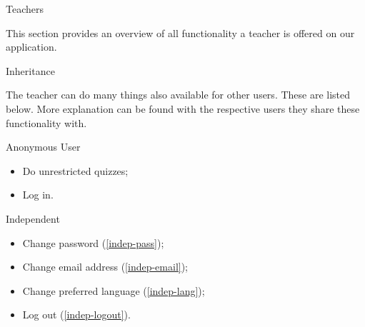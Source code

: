 
\begin{section}{Teachers}

    This section provides an overview of all functionality a teacher is offered
    on our application.

    \begin{subsection}{Inheritance}

        The teacher can do many things also available for other users. These are
        listed below. More explanation can be found with the respective users
        they share these functionality with.

        \begin{subsubsection}{Anonymous User}

            \begin{itemize}
                \item Do unrestricted quizzes;
                \item Log in.
            \end{itemize}

        \end{subsubsection}

        \begin{subsubsection}{Independent}

            \begin{itemize}
                \item Change password           (\ref{indep-pass});
                \item Change email address     (\ref{indep-email});
                \item Change preferred language (\ref{indep-lang});
                \item Log out                   (\ref{indep-logout}).
            \end{itemize}

        \end{subsubsection}

    \end{subsection}


\end{section}
